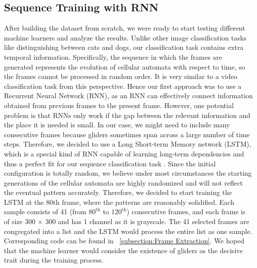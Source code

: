 \documentclass[12pt]{article}
\numberwithin{figure}{section} %
\begin{document}
\subsection{Sequence Training with RNN}
After building the dataset from scratch, we were ready to start testing different machine learners and analyze the results. Unlike other image classification tasks like distinguishing between cats and dogs, our classification task contains extra temporal information. Specifically, the sequence in which the frames are generated represents the evolution of cellular automata with respect to time, so the frames cannot be processed in random order. It is very similar to a video classification task from this perspective. Hence our first approach was to use a Recurrent Neural Network (RNN), as an RNN can effectively connect information obtained from previous frames to the present frame. However, one potential problem is that RNNs only work if the gap between the relevant information and the place it is needed is small. In our case, we might need to include many consecutive frames because gliders sometimes span across a large number of time steps. Therefore, we decided to use a Long Short-term Memory network (LSTM), which is a special kind of RNN capable of learning long-term dependencies and thus a perfect fit for our sequence classification task \cite{LSTM}. Since the initial configuration is totally random, we believe under most circumstances the starting generations of the cellular automata are highly randomized and will not reflect the eventual pattern accurately. Therefore, we decided to start training the LSTM at the 80th frame, where the patterns are reasonably solidified. Each sample consists of 41 (from $80^{\text{th}}$ to $120^{\text{th}}$) consecutive frames, and each frame is of size 300 × 300 and has 1 channel as it is grayscale. The 41 selected frames are congregated into a list and the LSTM would process the entire list as one sample. Corresponding code can be found in ~\ref{subsection:Frame Extraction}. We hoped that the machine learner would consider the existence of gliders as the decisive trait during the training process. 
\end{document}
